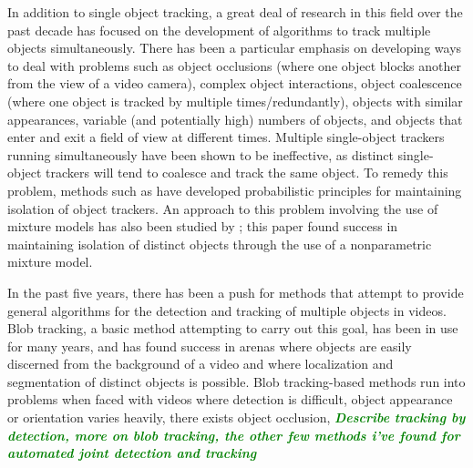 \documentclass[smallcondensed, final]{svjour3}
\newcommand{\willie}[1]{\textcolor{green}{\textsf{\emph{\textbf{\textcolor{green}{#1}}}}}}
\begin{document}
In addition to single object tracking, a great deal of research in this field over the past decade has focused on the development of algorithms to track multiple objects simultaneously. There has been a particular emphasis on developing ways to deal with problems such as object occlusions (where one object blocks another from the view of a video camera), complex object interactions, object coalescence (where one object is tracked by multiple times/redundantly), objects with similar appearances, variable (and potentially high) numbers of objects, and objects that enter and exit a field of view at different times. Multiple single-object trackers running simultaneously have been shown to be ineffective, as distinct single-object trackers will tend to coalesce and track the same object. To remedy this problem, methods such as \cite{maccormick1999probabilistic} have developed probabilistic principles for maintaining isolation of object trackers. An approach to this problem involving the use of mixture models has also been studied by \cite{vermaak_2003}; this paper found success in maintaining isolation of distinct objects through the use of a nonparametric mixture model.

In the past five years, there has been a push for methods that attempt to provide general algorithms for the detection and tracking of multiple objects in videos. Blob tracking, a basic method attempting to carry out this goal, has been in use for many years, and has found success in arenas where objects are easily discerned from the background of a video and where localization and segmentation of distinct objects is possible. Blob tracking-based methods run into problems when faced with videos where detection is difficult, object appearance or orientation varies heavily, there exists object occlusion, 
\willie{Describe tracking by detection, more on blob tracking, the other few methods i've found for automated joint detection and tracking}






% 
\end{document}
